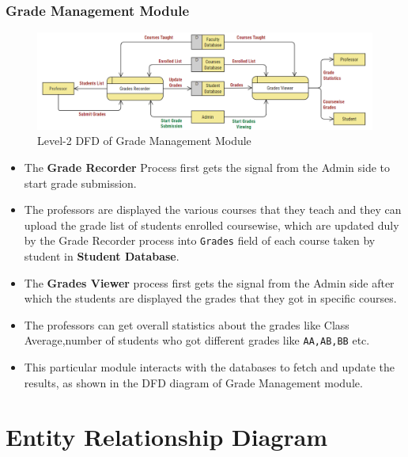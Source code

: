 \documentclass[12pt,a4paper]{article}
\begin{document}
\subsubsection{Grade Management Module}
\begin{figure}[H]
    \centering
        \includegraphics[width=\linewidth]{Grade_Management_DFD.png} 
    \caption{Level-2 DFD of Grade Management Module}
\end{figure}
\begin{itemize}
    \item The \textbf{Grade Recorder} Process first gets the signal from the Admin side to start grade submission.
    \item The professors are displayed the various courses that they teach and they can upload the grade list of students enrolled coursewise, which are updated duly by the Grade Recorder process into \texttt{Grades} field of each course taken by student in \textbf{Student Database}.
    \item The \textbf{Grades Viewer} process first gets the signal from the Admin side after which the students are displayed the grades that they got in specific courses.
    \item The professors can get overall statistics about the grades like Class Average,number of students who got different grades like \texttt{AA,AB,BB} etc.
    \item This particular module interacts with the databases to fetch and update the results, as shown in the DFD diagram of Grade Management module.
\end{itemize}
\section{Entity Relationship Diagram}
\end{document}
